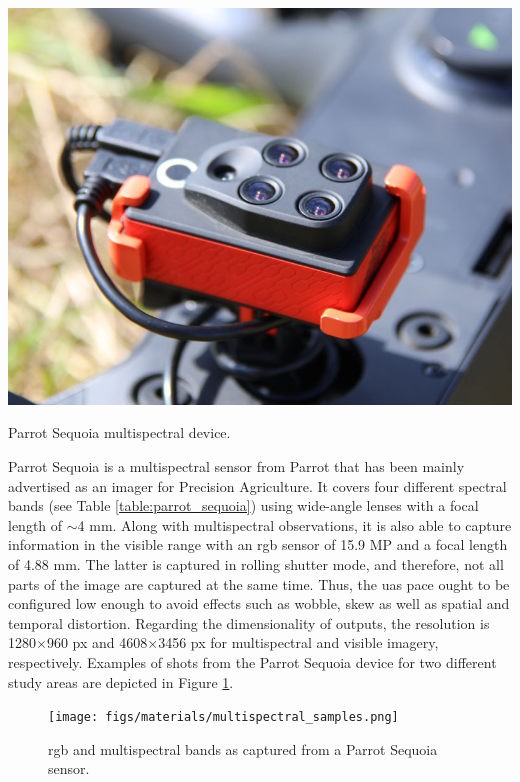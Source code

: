 \begin{marginfigure}[.2cm]
	\includegraphics{figs/materials/sequoia_parrot.jpg}
	\caption{Parrot Sequoia multispectral device.}
	\label{fig:parrot_sequoia}
\end{marginfigure}
Parrot Sequoia is a multispectral sensor from Parrot that has been mainly advertised as an imager for Precision Agriculture. It covers four different spectral bands (see Table \ref{table:parrot_sequoia}) using wide-angle lenses with a focal length of $\sim$4 \si{\milli\meter}. Along with multispectral observations, it is also able to capture information in the visible range with an \acrshort{rgb} sensor of 15.9 MP and a focal length of 4.88 \si{\milli\meter}. The latter is captured in rolling shutter mode, and therefore, not all parts of the image are captured at the same time. Thus, the \acrshort{uas} pace ought to be configured low enough to avoid effects such as wobble, skew as well as spatial and temporal distortion. Regarding the dimensionality of outputs, the resolution is 1280$\times$960 px and 4608$\times$3456 px for multispectral and visible imagery, respectively. Examples of shots from the Parrot Sequoia device for two different study areas are depicted in Figure \ref{fig:multispectral_samples}. 

\begin{figure}[ht]
	\texttt{[image: figs/materials/multispectral\_samples.png]}
	\caption{\acrshort{rgb} and multispectral bands as captured from a Parrot Sequoia sensor.}
	\label{fig:multispectral_samples}
\end{figure}


